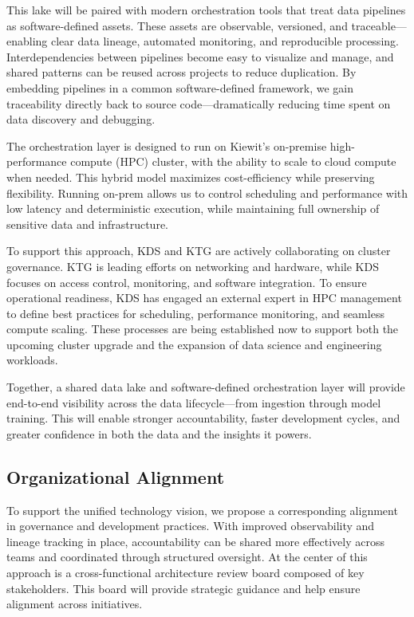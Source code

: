 \documentclass{article}
\begin{document}
This lake will be paired with modern orchestration tools that treat data pipelines as software-defined assets. These assets are observable, versioned, and traceable—enabling clear data lineage, automated monitoring, and reproducible processing. Interdependencies between pipelines become easy to visualize and manage, and shared patterns can be reused across projects to reduce duplication. By embedding pipelines in a common software-defined framework, we gain traceability directly back to source code—dramatically reducing time spent on data discovery and debugging.

The orchestration layer is designed to run on Kiewit’s on-premise high-performance compute (HPC) cluster, with the ability to scale to cloud compute when needed. This hybrid model maximizes cost-efficiency while preserving flexibility. Running on-prem allows us to control scheduling and performance with low latency and deterministic execution, while maintaining full ownership of sensitive data and infrastructure.

To support this approach, KDS and KTG are actively collaborating on cluster governance. KTG is leading efforts on networking and hardware, while KDS focuses on access control, monitoring, and software integration. To ensure operational readiness, KDS has engaged an external expert in HPC management to define best practices for scheduling, performance monitoring, and seamless compute scaling. These processes are being established now to support both the upcoming cluster upgrade and the expansion of data science and engineering workloads.

Together, a shared data lake and software-defined orchestration layer will provide end-to-end visibility across the data lifecycle—from ingestion through model training. This will enable stronger accountability, faster development cycles, and greater confidence in both the data and the insights it powers.

\subsection{Organizational Alignment}

To support the unified technology vision, we propose a corresponding alignment in governance and development practices. With improved observability and lineage tracking in place, accountability can be shared more effectively across teams and coordinated through structured oversight.
At the center of this approach is a cross-functional architecture review board composed of key stakeholders. This board will provide strategic guidance and help ensure alignment across initiatives.
\end{document}

